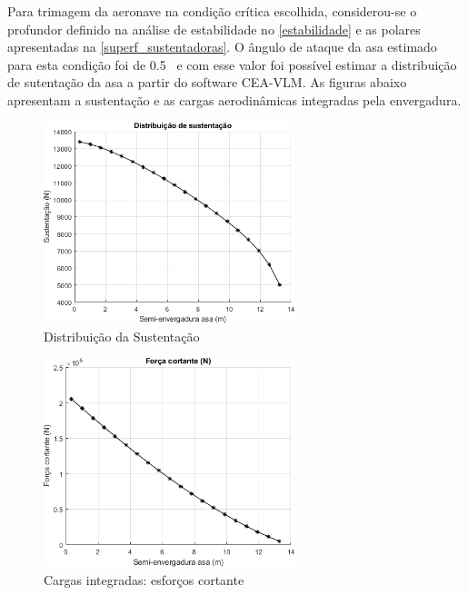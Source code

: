 Para trimagem da aeronave na condição crítica escolhida, considerou-se o profundor definido na análise de estabilidade no \autoref{estabilidade} e as polares apresentadas na \autoref{superf_sustentadoras}.
O ângulo de ataque da asa estimado para esta condição foi de 0.5 \textdegree\ e com esse valor foi possível estimar a distribuição de sutentação da asa a partir do software CEA-VLM.
As figuras abaixo apresentam a sustentação e as cargas aerodinâmicas integradas pela envergadura.

\begin{figure}[H]
\centering
\includegraphics[width=0.65\textwidth]{images/parte3/loads_lift.png}
\caption{Distribuição da Sustentação}
\label{fig:loads_lift}
\end{figure}

\clearpage

\begin{figure}[H]
\centering
\includegraphics[width=0.65\textwidth]{images/parte3/loads_shear.png}
\caption{Cargas integradas: esforços cortante}
\label{fig:loads_shear}
\end{figure}


